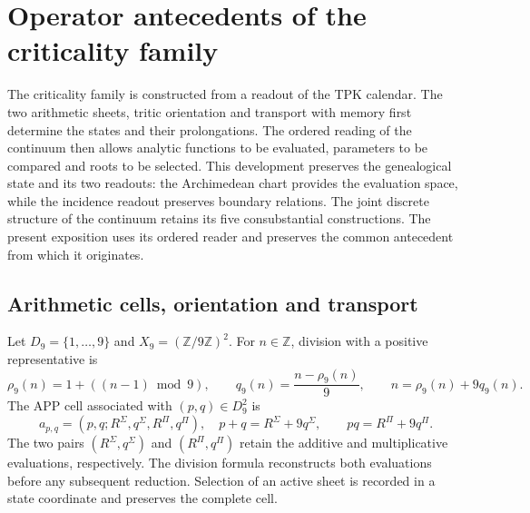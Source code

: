 \providecommand{\ZZ}{\mathbb Z}
\providecommand{\RR}{\mathbb R}
\providecommand{\FF}{\mathbb F}
\providecommand{\APP}{\mathrm{APP}}
\providecommand{\TPK}{\mathrm{TPK}}
\providecommand{\TRIT}{\{-1,0,+1\}}

\section{Operator antecedents of the criticality family}
\label{hmtfg:antecedentes-operatorios}

The criticality family is constructed from a readout of the TPK calendar. The two arithmetic sheets, tritic orientation and transport with memory first determine the states and their prolongations. The ordered reading of the continuum then allows analytic functions to be evaluated, parameters to be compared and roots to be selected. This development preserves the genealogical state and its two readouts: the Archimedean chart provides the evaluation space, while the incidence readout preserves boundary relations. The joint discrete structure of the continuum retains its five consubstantial constructions. The present exposition uses its ordered reader and preserves the common antecedent from which it originates.

\subsection{Arithmetic cells, orientation and transport}
\label{hmtfg:app-trit-transporte}

Let \(D_9=\{1,\ldots,9\}\) and \(X_9=(\ZZ/9\ZZ)^2\). For
\(n\in\ZZ\), division with a positive representative is
\[
 \rho_9(n)=1+((n-1)\bmod9),\qquad
 q_9(n)=\frac{n-\rho_9(n)}9,\qquad
 n=\rho_9(n)+9q_9(n).
\]
The APP cell associated with \((p,q)\in D_9^2\) is
\[
 a_{p,q}=(p,q;R^\Sigma,q^\Sigma,R^\Pi,q^\Pi),
 \quad
 p+q=R^\Sigma+9q^\Sigma,\qquad
 pq=R^\Pi+9q^\Pi.
\]
The two pairs \((R^\Sigma,q^\Sigma)\) and \((R^\Pi,q^\Pi)\) retain the additive and multiplicative evaluations, respectively. The division formula reconstructs both evaluations before any subsequent reduction. Selection of an active sheet is recorded in a state coordinate and preserves the complete cell.


